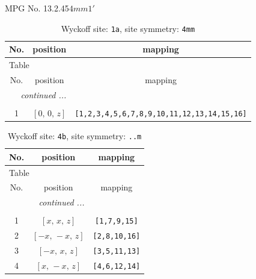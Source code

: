 \documentclass[fleqn,8pt]{jsarticle}
\begin{document}
\setcounter{MaxMatrixCols}{32}

\renewcommand{\tablename}{Table~}
\renewcommand{\figurename}{Figure~}
\begin{center}
\LARGE
MPG No. 13.2.45\quad$4mm1'$
\end{center}
\renewcommand{\arraystretch}{1.2}
\begin{longtable}{ccc}
\caption{Wyckoff site: {\tt 1a}, site symmetry: {\tt 4mm}}
 \\
 \hline \hline
No. & position & mapping \\ \hline \endfirsthead

\multicolumn{2}{l}{\tablename\ \thetable{}} \\
 \hline \hline
No. & position & mapping \\ \hline \endhead

 \hline \hline
\multicolumn{2}{r}{\footnotesize\it continued ...} \\ \endfoot

 \hline \hline
\multicolumn{2}{r}{} \\ \endlastfoot

1 & $\left[ 0,\, 0,\, z \right]$ & {\tt [1,2,3,4,5,6,7,8,9,10,11,12,13,14,15,16]} \\
\end{longtable}
\renewcommand{\arraystretch}{1.2}
\begin{longtable}{ccc}
\caption{Wyckoff site: {\tt 4b}, site symmetry: {\tt ..m}}
 \\
 \hline \hline
No. & position & mapping \\ \hline \endfirsthead

\multicolumn{2}{l}{\tablename\ \thetable{}} \\
 \hline \hline
No. & position & mapping \\ \hline \endhead

 \hline \hline
\multicolumn{2}{r}{\footnotesize\it continued ...} \\ \endfoot

 \hline \hline
\multicolumn{2}{r}{} \\ \endlastfoot

1 & $\left[ x,\, x,\, z \right]$ & {\tt [1,7,9,15]} \\ \hline
2 & $\left[ - x,\, - x,\, z \right]$ & {\tt [2,8,10,16]} \\ \hline
3 & $\left[ - x,\, x,\, z \right]$ & {\tt [3,5,11,13]} \\ \hline
4 & $\left[ x,\, - x,\, z \right]$ & {\tt [4,6,12,14]} \\
\end{longtable}
\end{document}
